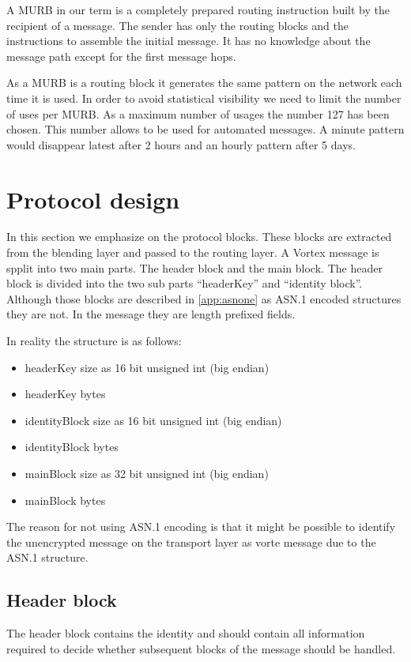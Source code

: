 A MURB in our term is a completely prepared routing instruction built by the recipient of a message. The sender has only the routing blocks and the instructions to assemble the initial message. It has no knowledge about the message path except for the first message hops.

As a MURB is a routing block it generates the same pattern on the network each time it is used. In order to avoid statistical visibility we need to limit the number of uses per MURB. As a maximum number of usages the number 127 has been chosen. This number allows to be used for automated messages. A minute pattern would disappear latest after 2 hours and an hourly pattern after 5 days.

\section{Protocol design}
In this section we emphasize on the protocol blocks. These blocks are extracted from the blending layer and passed to the routing layer. A Vortex message is spplit into two main parts. The header block and the main block. The header block is divided into the two sub parts ``headerKey'' and ``identity block''. Although those blocks are described in \ref{app:asnone} as ASN.1 encoded structures they are not. In the message they are length prefixed fields.

In reality the structure is as follows:
\begin{itemize}
	\item headerKey size as 16 bit unsigned int (big endian)
	\item headerKey bytes
	\item identityBlock size as 16 bit unsigned int (big endian)
	\item identityBlock bytes
	\item mainBlock size as 32 bit unsigned int (big endian)
	\item mainBlock bytes
\end{itemize}

The reason for not using ASN.1 encoding is that it might be possible to identify the unencrypted message on the transport layer as vorte message due to the ASN.1 structure.

\subsection{Header block}
The header block contains the identity and should contain all information required to decide whether subsequent blocks of the message should be handled.

